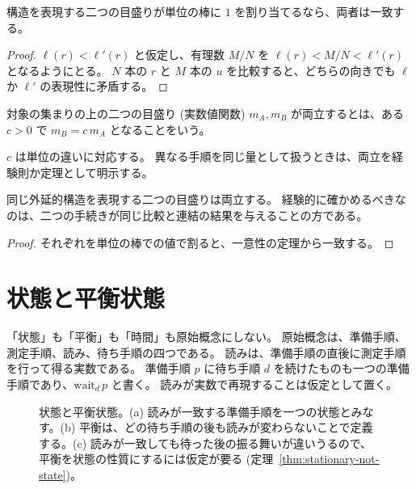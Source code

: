 \begin{theorem}[目盛りの一意性]
  \label{thm:length-unique}
  \leanok
  構造を表現する二つの目盛りが単位の棒に $1$ を割り当てるなら、両者は一致する。
\end{theorem}

\begin{proof}
  \leanok
  $\ell(r) < \ell'(r)$ と仮定し、有理数 $M/N$ を $\ell(r) < M/N < \ell'(r)$ となるようにとる。
  $N$ 本の $r$ と $M$ 本の $u$ を比較すると、どちらの向きでも $\ell$ か $\ell'$ の表現性に矛盾する。
\end{proof}

\begin{definition}[目盛りの両立性]
  \label{def:compatible}
  \leanok
  対象の集まりの上の二つの目盛り (実数値関数) $m_A, m_B$ が両立するとは、ある $c > 0$ で $m_B = c\, m_A$ となることをいう。
\end{definition}

$c$ は単位の違いに対応する。
異なる手順を同じ量として扱うときは、両立を経験則か定理として明示する。

\begin{theorem}[同じ構造を表現する目盛りは比例する]
  \label{thm:compatible-represents}
  \leanok
  同じ外延的構造を表現する二つの目盛りは両立する。
  経験的に確かめるべきなのは、二つの手続きが同じ比較と連結の結果を与えることの方である。
\end{theorem}

\begin{proof}
  \leanok
  それぞれを単位の棒での値で割ると、一意性の定理から一致する。
\end{proof}

\chapter{状態と平衡状態}

「状態」も「平衡」も「時間」も原始概念にしない。
原始概念は、準備手順、測定手順、読み、待ち手順の四つである。
読みは、準備手順の直後に測定手順を行って得る実数である。
準備手順 $p$ に待ち手順 $d$ を続けたものも一つの準備手順であり、$\mathrm{wait}_d\, p$ と書く。
読みが実数で再現することは仮定として置く。

\begin{figure}[htbp]
  \centering
  \caption{状態と平衡状態。(a) 読みが一致する準備手順を一つの状態とみなす。(b) 平衡は、どの待ち手順の後も読みが変わらないことで定義する。(c) 読みが一致しても待った後の振る舞いが違いうるので、平衡を状態の性質にするには仮定が要る (定理~\ref{thm:stationary-not-state})。}
  \label{fig:states}
\end{figure}

